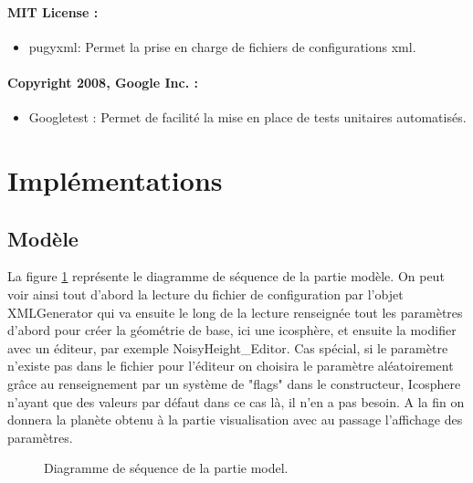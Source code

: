 \documentclass[a4paper]{article}
\begin{document}
\paragraph{MIT License :}
\begin{itemize}
\item pugyxml:
    Permet la prise en charge de fichiers de configurations xml.
\end{itemize}

\paragraph{Copyright 2008, Google Inc. :}
\begin{itemize}
\item Googletest :
    Permet de facilité la mise en place de tests unitaires automatisés. 
\end{itemize}

\newpage 
\section{Implémentations}

\subsection{Modèle}

La figure \ref{seqmodel} représente le diagramme de séquence de la partie modèle. 
On peut voir ainsi tout d'abord la lecture du fichier de configuration par l'objet XMLGenerator qui va ensuite le long de la lecture renseignée tout les paramètres d'abord pour créer la géométrie de base, ici une icosphère, et ensuite la modifier avec un éditeur, par exemple NoisyHeight\_Editor. Cas spécial, si le paramètre n'existe pas dans le fichier pour l'éditeur on choisira le paramètre aléatoirement grâce au renseignement par un système de "flags" dans le constructeur, Icosphere n'ayant que des valeurs par défaut dans ce cas là, il n'en a pas besoin. A la fin on donnera la planète obtenu à la partie visualisation avec au passage l'affichage des paramètres.\\

\begin{figure}[!ht]
\centering
\caption{Diagramme de séquence de la partie model.}
\label{seqmodel}
\end{figure}
\end{document}
